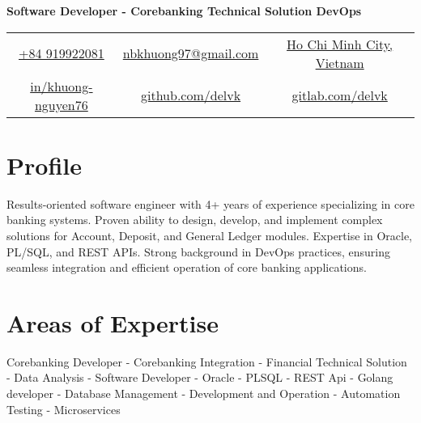 \documentclass[11pt,a4paper,sans]{moderncv}
\begin{document}
\makecvtitle
\vspace*{-13mm}
\begin{center}\textbf{ Software Developer - Corebanking Technical Solution DevOps }\end{center}
\begin{center}
	\begin{tabular}{ c c c }
		\quad\faMobile\enskip\href{tel:84919922081}{+84 919922081} & 
		\quad\faEnvelope\enskip\href{mailto:nbkhuong97@gmail.com}{nbkhuong97@gmail.com} & 
		\quad\faHome\enskip\href{https://maps.app.goo.gl/bPBkQjCccZoTX1u69}{Ho Chi Minh City, Vietnam} \\
		\faLinkedin\enskip\color{blue}\href{https://www.linkedin.com/in/khuong-nguyen76/}{in/khuong-nguyen76} &
		\quad\faGithub\enskip\color{blue}\href{https://github.com/delvk}{github.com/delvk} & \faGitlab\enspace \color{blue} \href{https://gitlab.com/delvk}{gitlab.com/delvk}
	\end{tabular}
\end{center}

\section{Profile}
{Results-oriented software engineer with 4+ years of experience specializing in core banking systems. Proven ability to design, develop, and implement complex solutions for Account, Deposit, and General Ledger modules. Expertise in Oracle, PL/SQL, and REST APIs. Strong background in DevOps practices, ensuring seamless integration and efficient operation of core banking applications.}

\section{Areas of Expertise}
{Corebanking Developer - Corebanking Integration - Financial Technical Solution - Data Analysis - Software Developer - Oracle - PLSQL - REST Api - Golang developer - Database Management - Development and Operation - Automation Testing - Microservices}
\end{document}
